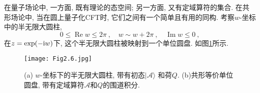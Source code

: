 在量子场论中, 一方面, 既有理论的态空间; 另一方面, 又有定域算符的集合. 在共形场论中, 当在圆上量子化CFT时, 它们之间有一个简单且有用的同构. 考察$w$-坐标中的半无限大圆柱,
\begin{equation}
0 \leq \operatorname{Re} w \leq 2 \pi \:, \quad w \sim w+2 \pi \:, \quad \operatorname{Im} w \leq 0 \:, \label{2.8.1}
\end{equation}
在$z=\exp (-\mathrm{i} w)$下, 这个半无限大圆柱被映射到一个单位圆盘. 如图\ref{Fig2.6}所示.
\vspace*{-2cm}
\begin{figure}[h]
\begin{center}
\texttt{[image: Fig2.6.jpg]}
\caption{(a) $w$-坐标下的半无限大圆柱, 带有初态$\lvert\mathscr{A}\rangle$ 和荷$Q$. 
(b)共形等价单位圆盘, 带有定域算符$\mathscr{A}$和$Q$的围道积分.}\label{Fig2.6}
\end{center}
\end{figure}

